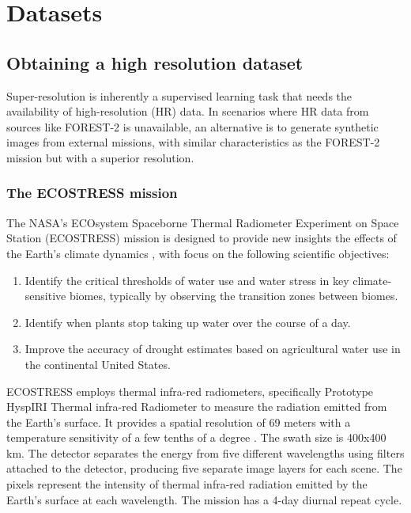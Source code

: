 \section{Datasets}

\subsection{Obtaining a high resolution dataset}
    
    
Super-resolution is inherently a supervised learning task that needs the availability of high-resolution (HR) data. In scenarios where HR data from sources like FOREST-2 is unavailable, an alternative is to generate synthetic images from external missions, with similar characteristics as the FOREST-2 mission but with a superior resolution.

\subsubsection{The ECOSTRESS mission}

The NASA's ECOsystem Spaceborne Thermal Radiometer Experiment on Space Station (ECOSTRESS) mission is designed to provide new insights the effects of the Earth's climate dynamics \cite{ECOSTRESS2023}, with focus on the following scientific objectives:

\begin{enumerate}
    \item Identify the critical thresholds of water use and water stress in key climate-sensitive biomes, typically by observing the transition zones between biomes.
    \item Identify when plants stop taking up water over the course of a day.
    \item Improve the accuracy of drought estimates based on agricultural water use in the continental United States. 
\end{enumerate}

ECOSTRESS employs thermal infra-red radiometers, specifically Prototype HyspIRI Thermal infra-red Radiometer \cite{PhyTIR2023} to measure the radiation emitted from the Earth's surface. It provides a spatial resolution of 69 meters with a temperature sensitivity of a few tenths of a degree \cite{ECOSTRESS2023}.  The swath size is 400x400 km. The detector separates the energy from five different wavelengths using filters attached to the detector, producing five separate image layers for each scene. The pixels represent the intensity of thermal infra-red radiation emitted by the Earth's surface at each wavelength. The mission has a 4-day diurnal repeat cycle.

